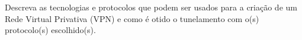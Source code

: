 \exercise Descreva as tecnologias e protocolos que podem ser usados
para a criação de um Rede Virtual Privativa (VPN) e como é otido o
tunelamento com o(s) protocolo(s) escolhido(s).\par